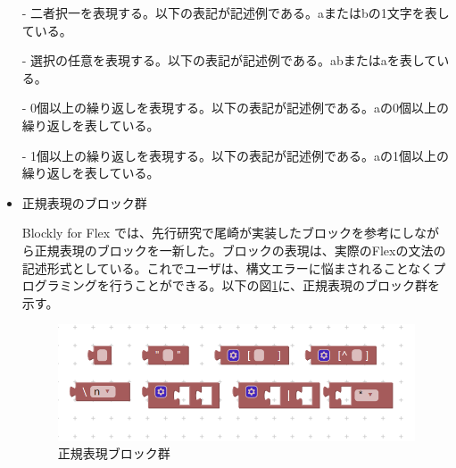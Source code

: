 \documentclass{risepaper}
\begin{document}
\begin{itemize}
- 二者択一を表現する。以下の表記が記述例である。aまたはbの1文字を表している。


- 選択の任意を表現する。以下の表記が記述例である。abまたはaを表している。


- 0個以上の繰り返しを表現する。以下の表記が記述例である。aの0個以上の繰り返しを表している。


- 1個以上の繰り返しを表現する。以下の表記が記述例である。aの1個以上の繰り返しを表している。


\item 正規表現のブロック群

Blockly for Flex では、先行研究で尾崎が実装したブロックを参考にしながら正規表現のブロックを一新した。ブロックの表現は、実際のFlexの文法の記述形式としている。これでユーザは、構文エラーに悩まされることなくプログラミングを行うことができる。以下の図\ref{fig:flex_RE_blocks}に、正規表現のブロック群を示す。

\begin{figure}[h]
\begin{center}
\includegraphics[scale=0.8]{img/flex_RE_blocks.PNG}
\caption{正規表現ブロック群}%
\label{fig:flex_RE_blocks}
\end{center}%
\end{figure}%


\end{itemize}
\end{document}
